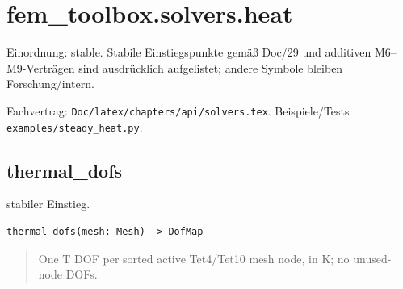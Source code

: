 \section{fem\_toolbox.solvers.heat}
Einordnung: stable. Stabile Einstiegspunkte gemäß Doc/29 und additiven M6–M9-Verträgen sind ausdrücklich aufgelistet; andere Symbole bleiben Forschung/intern.
\par Fachvertrag: \nolinkurl{Doc/latex/chapters/api/solvers.tex}. Beispiele/Tests:
\nolinkurl{examples/steady_heat.py}.
\subsection{thermal\_dofs}
stabiler Einstieg.
\begin{lstlisting}
thermal_dofs(mesh: Mesh) -> DofMap
\end{lstlisting}
\begin{quote}
One T DOF per sorted active Tet4/Tet10 mesh node, in K; no unused-node DOFs.
\end{quote}
